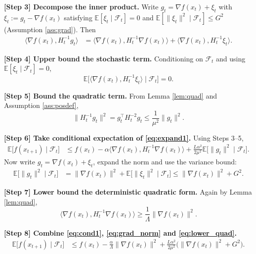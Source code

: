 \documentclass{article}
\begin{document}
\noindent\textbf{[Step 3] Decompose the inner product.}  
Write $g_{t}= \nabla f(x_{t}) + \xi_{t}$ with $\xi_{t}:=g_{t}-\nabla f(x_{t})$ satisfying $\mathbb{E}[\xi_{t}\mid\mathcal{F}_{t}]=0$ and $\mathbb{E}[\|\xi_{t}\|^{2}\mid\mathcal{F}_{t}]\le G^{2}$ (Assumption \ref{ass:grad}). Then
\begin{align}
\langle \nabla f(x_{t}), H_{t}^{-1}g_{t}\rangle
&= \langle \nabla f(x_{t}), H_{t}^{-1}\nabla f(x_{t})\rangle
   +\langle \nabla f(x_{t}), H_{t}^{-1}\xi_{t}\rangle . \label{eq:inner_decomp}
\end{align}

\noindent\textbf{[Step 4] Upper bound the stochastic term.}  
Conditioning on $\mathcal{F}_{t}$ and using $\mathbb{E}[\xi_{t}\mid\mathcal{F}_{t}]=0$,
\[
\mathbb{E}\!\big[\langle \nabla f(x_{t}), H_{t}^{-1}\xi_{t}\rangle\mid\mathcal{F}_{t}\big]=0.
\]

\noindent\textbf{[Step 5] Bound the quadratic term.}  
From Lemma \ref{lem:quad} and Assumption \ref{ass:posdef},
\[
\|H_{t}^{-1}g_{t}\|^{2}
= g_{t}^{\top}H_{t}^{-2}g_{t}
\le \frac{1}{\mu^{2}}\|g_{t}\|^{2}. \label{eq:quad_bound}
\]

\noindent\textbf{[Step 6] Take conditional expectation of \eqref{eq:expand1}.}  
Using Steps 3–5,
\begin{align}
\mathbb{E}\!\big[f(x_{t+1})\mid\mathcal{F}_{t}\big]
&\le f(x_{t})
-\alpha\langle \nabla f(x_{t}), H_{t}^{-1}\nabla f(x_{t})\rangle
+\frac{L\alpha^{2}}{2\mu^{2}}\mathbb{E}\!\big[\|g_{t}\|^{2}\mid\mathcal{F}_{t}\big]. \label{eq:cond1}
\end{align}
Now write $g_{t}=\nabla f(x_{t})+\xi_{t}$, expand the norm and use the variance bound:
\begin{align}
\mathbb{E}\!\big[\|g_{t}\|^{2}\mid\mathcal{F}_{t}\big]
&= \|\nabla f(x_{t})\|^{2}+ \mathbb{E}\!\big[\|\xi_{t}\|^{2}\mid\mathcal{F}_{t}\big]
\le \|\nabla f(x_{t})\|^{2}+G^{2}. \label{eq:grad_norm}
\end{align}

\noindent\textbf{[Step 7] Lower bound the deterministic quadratic form.}  
Again by Lemma \ref{lem:quad},
\[
\langle \nabla f(x_{t}), H_{t}^{-1}\nabla f(x_{t})\rangle
\ge \frac{1}{\Lambda}\|\nabla f(x_{t})\|^{2}. \label{eq:lower_quad}
\]

\noindent\textbf{[Step 8] Combine \eqref{eq:cond1}, \eqref{eq:grad_norm} and \eqref{eq:lower_quad}.}
\begin{align}
\mathbb{E}\!\big[f(x_{t+1})\mid\mathcal{F}_{t}\big]
&\le f(x_{t})
-\frac{\alpha}{\Lambda}\|\nabla f(x_{t})\|^{2}
+\frac{L\alpha^{2}}{2\mu^{2}}\big(\|\nabla f(x_{t})\|^{2}+G^{2}\big). \label{eq:combine1}
\end{align}
\end{document}
